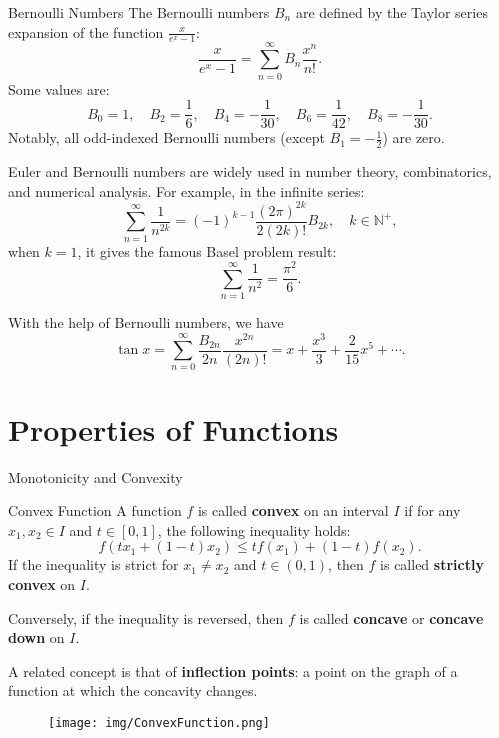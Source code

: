 \documentclass[11pt]{../../TexTemplate/elegantbook}
\begin{document}
\begin{definition}{Bernoulli Numbers}
    The Bernoulli numbers \(B_n\) are defined by the Taylor series expansion of the function \(\frac{x}{e^x - 1}\):
    \[
        \frac{x}{e^x - 1} = \sum_{n=0}^{\infty} B_n \frac{x^n}{n!}.
    \]
    Some values are:
    \[
        B_0 = 1, \quad B_2 = \frac{1}{6}, \quad B_4 = -\frac{1}{30}, \quad B_6 = \frac{1}{42}, \quad B_8 = -\frac{1}{30}.
    \]
    Notably, all odd-indexed Bernoulli numbers (except \(B_1 = -\frac{1}{2}\)) are zero.
\end{definition}

\begin{remark}
    Euler and Bernoulli numbers are widely used in number theory, combinatorics, and numerical analysis.
    For example, in the infinite series:
    \[
    \sum_{n=1}^{\infty}  \frac{1}{n^{2k}} = (-1)^{k-1} \frac{(2\pi)^{2k}}{2(2k)!} B_{2k},\quad k \in \mathbb{N}^{+},
    \]
    when \(k=1\), it gives the famous Basel problem result:
    \[
    \sum_{n=1}^{\infty}  \frac{1}{n^{2}} = \frac{\pi^2}{6}.
    \]
\end{remark}

With the help of Bernoulli numbers, we have
\[
\tan x = \sum_{n=0}^{\infty} \frac{B_{2n}}{2n} \frac{x^{2n}}{(2n)!} = 
x + \frac{x^3}{3} + \frac{2}{15}x^5 + \cdots.
\]


\section{Properties of Functions}
\begin{leftbarTitle}{Monotonicity and Convexity}\end{leftbarTitle}
\begin{definition}{Convex Function}
    A function \(f\) is called \textbf{convex} on an interval \(I\) if for any \(x_1, x_2 \in I\) and 
    \(t \in [0,1]\), the following inequality holds:
    \[
        f(t x_1 + (1-t)x_2) \leqslant t f(x_1) + (1-t)f(x_2).
    \]
    If the inequality is strict for \(x_1 \neq x_2\) and \(t \in (0,1)\), 
    then \(f\) is called \textbf{strictly convex} on \(I\).

    Conversely, if the inequality is reversed, then \(f\) is called \textbf{concave} or \textbf{concave down} on \(I\).
\end{definition}
A related concept is that of \textbf{inflection points}:
a point on the graph of a function at which the concavity changes.

\begin{figure}[h]
    \centering
    \texttt{[image: img/ConvexFunction.png]}
\end{figure}
\end{document}
